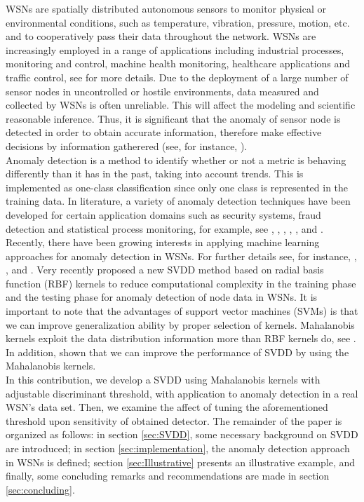 \documentclass[conference]{IEEEtran}
\theoremstyle{problemstyle}
\begin{document}
WSNs are spatially distributed autonomous sensors to monitor physical or environmental conditions, such as temperature, vibration, pressure, motion, etc. and to cooperatively pass their data throughout the network. WSNs are increasingly employed in a range of applications including industrial processes, monitoring and control, machine health monitoring, healthcare applications and traffic control, see \cite{Xie2011} for more details. Due to the deployment of a large number of sensor nodes in uncontrolled or hostile environments, data measured and collected by WSNs is often  unreliable. This will affect the modeling and scientific reasonable inference. Thus, it is significant that the anomaly of sensor node is detected in order to obtain accurate information, therefore make effective decisions by information gatherered (see, for instance, \cite{sharma2010sensor}).\\

Anomaly detection is a method to identify whether or not a metric is behaving differently than it has in the past, taking into account trends. This is implemented as one-class classification since only one class is represented in the training data. In literature, a variety of anomaly detection techniques have been developed for certain application domains such as security systems, fraud detection and statistical process monitoring, for example, see \cite{ilonen2006gaussian}, \cite{clifton2011novelty}, \cite{Tran2015a}, \cite{Tran2015b}, \cite{Chandola2016}, \cite{Tran2016} and \cite{Tran2016c}. Recently, there have been growing interests in applying machine learning approaches for anomaly detection in WSNs. For further details see, for instance, \cite{sharma2010sensor}, \cite{Xie2011}, \cite{Rajasegarar2014} and \cite{Chandola2016}. Very recently \cite{feng2017new} proposed a new SVDD method \cite{Tax2004} based on radial basis function (RBF) kernels to reduce computational complexity in the training phase and the testing phase for anomaly detection of node data in WSNs. It is important to note that the advantages of support vector machines (SVMs) \cite{Vapnik1998} is that we can improve generalization ability by proper selection of kernels. Mahalanobis kernels exploit the data distribution information more than RBF kernels do, see \cite{abe2005training}. In addition, \cite{maboudou2016monitoring} shown that we can improve the performance of SVDD by using the Mahalanobis kernels.\\

In this contribution, we develop a SVDD using Mahalanobis kernels with adjustable discriminant threshold, with application to anomaly detection in a real WSN's data set. Then, we examine the affect of tuning the aforementioned threshold upon sensitivity of obtained detector. The remainder of the paper is organized as follows: in section \ref{sec:SVDD}, some necessary background on SVDD are introduced; in section \ref{sec:implementation}, the anomaly detection approach in WSNs is defined; section \ref{sec:Illustrative} presents an illustrative example, and finally, some concluding remarks and recommendations are made in section \ref{sec:concluding}.
\end{document}
